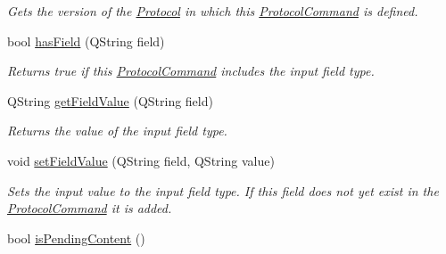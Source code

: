 \begin{DoxyCompactItemize}
\begin{DoxyCompactList}\small\item\em Gets the version of the \hyperlink{struct_picto_1_1_protocol}{Protocol} in which this \hyperlink{struct_picto_1_1_protocol_command}{Protocol\-Command} is defined. \end{DoxyCompactList}\item 
\hypertarget{struct_picto_1_1_protocol_command_ac64b05348eadbffb42b3d8063895c8e0}{bool \hyperlink{struct_picto_1_1_protocol_command_ac64b05348eadbffb42b3d8063895c8e0}{has\-Field} (Q\-String field)}\label{struct_picto_1_1_protocol_command_ac64b05348eadbffb42b3d8063895c8e0}

\begin{DoxyCompactList}\small\item\em Returns true if this \hyperlink{struct_picto_1_1_protocol_command}{Protocol\-Command} includes the input field type. \end{DoxyCompactList}\item 
\hypertarget{struct_picto_1_1_protocol_command_abb55d5c9068111e39e367f54d09f7cf1}{Q\-String \hyperlink{struct_picto_1_1_protocol_command_abb55d5c9068111e39e367f54d09f7cf1}{get\-Field\-Value} (Q\-String field)}\label{struct_picto_1_1_protocol_command_abb55d5c9068111e39e367f54d09f7cf1}

\begin{DoxyCompactList}\small\item\em Returns the value of the input field type. \end{DoxyCompactList}\item 
void \hyperlink{struct_picto_1_1_protocol_command_a5861b74db064cda1640facab025a5c4d}{set\-Field\-Value} (Q\-String field, Q\-String value)
\begin{DoxyCompactList}\small\item\em Sets the input value to the input field type. If this field does not yet exist in the \hyperlink{struct_picto_1_1_protocol_command}{Protocol\-Command} it is added. \end{DoxyCompactList}\item 
\hypertarget{struct_picto_1_1_protocol_command_a75edefa02f23f8ea9425644637870a3c}{bool \hyperlink{struct_picto_1_1_protocol_command_a75edefa02f23f8ea9425644637870a3c}{is\-Pending\-Content} ()}\label{struct_picto_1_1_protocol_command_a75edefa02f23f8ea9425644637870a3c}


\end{DoxyCompactItemize}

